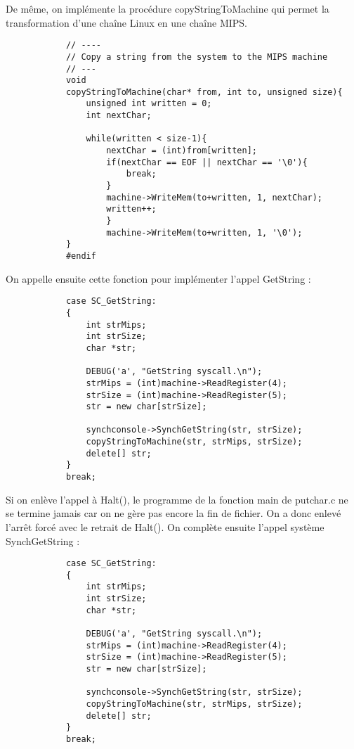 \documentclass[a4paper,10pt]{article}
\begin{document}
         De même, on implémente la procédure copyStringToMachine qui permet la transformation d'une chaîne Linux en une chaîne MIPS.
        \begin{lstlisting}
            // ----
            // Copy a string from the system to the MIPS machine
            // ---
            void
            copyStringToMachine(char* from, int to, unsigned size){
                unsigned int written = 0;
                int nextChar;

                while(written < size-1){
                    nextChar = (int)from[written];
                    if(nextChar == EOF || nextChar == '\0'){
                        break;
                    }
                    machine->WriteMem(to+written, 1, nextChar);
                    written++;
                    }
                    machine->WriteMem(to+written, 1, '\0');
            }
            #endif
        \end{lstlisting}
        On appelle ensuite cette fonction pour implémenter l'appel GetString :
        \begin{lstlisting}
            case SC_GetString:
            {
                int strMips;
                int strSize;
                char *str;

                DEBUG('a', "GetString syscall.\n");
                strMips = (int)machine->ReadRegister(4);
                strSize = (int)machine->ReadRegister(5);
                str = new char[strSize];

                synchconsole->SynchGetString(str, strSize);
                copyStringToMachine(str, strMips, strSize);
                delete[] str;
            }
            break;
        \end{lstlisting}
        Si on enlève l'appel à Halt(), le programme de la fonction main de putchar.c ne se termine jamais car on ne gère pas encore la fin de fichier. On a donc enlevé l'arrêt forcé avec le retrait de Halt(). On complète ensuite l'appel système SynchGetString :
        \begin{lstlisting}
            case SC_GetString:
            {
                int strMips;
                int strSize;
                char *str;

                DEBUG('a', "GetString syscall.\n");
                strMips = (int)machine->ReadRegister(4);
                strSize = (int)machine->ReadRegister(5);
                str = new char[strSize];

                synchconsole->SynchGetString(str, strSize);
                copyStringToMachine(str, strMips, strSize);
                delete[] str;
            }
            break;
        \end{lstlisting}
\end{document}
